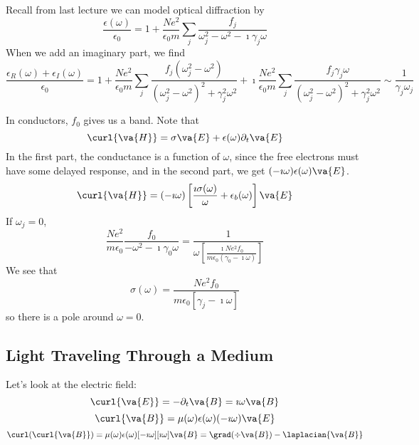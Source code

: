 \documentclass[a4paper,twoside,master.tex]{subfiles}
\begin{document}

Recall from last lecture we can model optical diffraction by
\begin{equation}
    \frac{\epsilon(\omega)}{\epsilon_0} = 1 + \frac{N e^2}{\epsilon_0 m} \sum_{j} \frac{f_j}{\omega_{j}^2 - \omega^2 - \imath \gamma_j \omega}
\end{equation}
When we add an imaginary part, we find
\begin{equation}
    \frac{\epsilon_R(\omega) + \epsilon_I(\omega)}{\epsilon_0} = 1 + \frac{N e^2}{\epsilon_0 m} \sum_j \frac{f_j(\omega_j^2 - \omega^2)}{(\omega_j^2 - \omega^2)^2 + \gamma_j^2 \omega^2} + \imath \frac{N e^2}{\epsilon_0 m} \sum_j \frac{f_j \gamma_j \omega}{(\omega_j^2 - \omega^2)^2 + \gamma^2_j \omega^2} \sim \frac{1}{\gamma_j \omega_j} 
\end{equation}

In conductors, $ f_0 $ gives us a band. Note that
\begin{equation}
    \curl{\va{H}} = \sigma \va{E} + \epsilon(\omega) \partial_t \va{E}
\end{equation}
In the first part, the conductance is a function of $ \omega $, since the free electrons must have some delayed response, and in the second part, we get $ (- \imath \omega) \epsilon(\omega) \va{E} $.
\begin{equation}
    \curl{\va{H}} = (-\imath \omega) \left[ \frac{\imath \sigma(\omega)}{\omega} + \epsilon_b(\omega) \right] \va{E}
\end{equation}
If $ \omega_j = 0 $,
\begin{equation}
    \frac{N e^2}{m \epsilon_0} \frac{f_0}{- \omega^2 - \imath \gamma_0 \omega} = \frac{1}{\omega \left[ \frac{\imath N e^2 f_0}{m \epsilon_0 (\gamma_0 - \imath \omega)} \right]} 
\end{equation}
We see that
\begin{equation}
    \sigma(\omega) = \frac{N e^2 f_0}{m \epsilon_0 [\gamma_j - \imath \omega]}
\end{equation}
so there is a pole around $ \omega = 0 $.

\subsection{Light Traveling Through a Medium}
\label{sub:light_traveling_through_a_medium}

Let's look at the electric field:
\begin{equation}
    \curl{\va{E}} = - \partial_t \va{B} = \imath \omega \va{B}
\end{equation}
\begin{equation}
    \curl{\va{B}} = \mu(\omega) \epsilon(\omega)(-\imath \omega) \va{E}
\end{equation}
\begin{equation}
    \curl(\curl{\va{B}}) = \mu(\omega) \epsilon(\omega) [- \imath \omega][\imath \omega]\va{B} = \grad(\div{\va{B}}) - \laplacian{\va{B}}
\end{equation}
\end{document}

